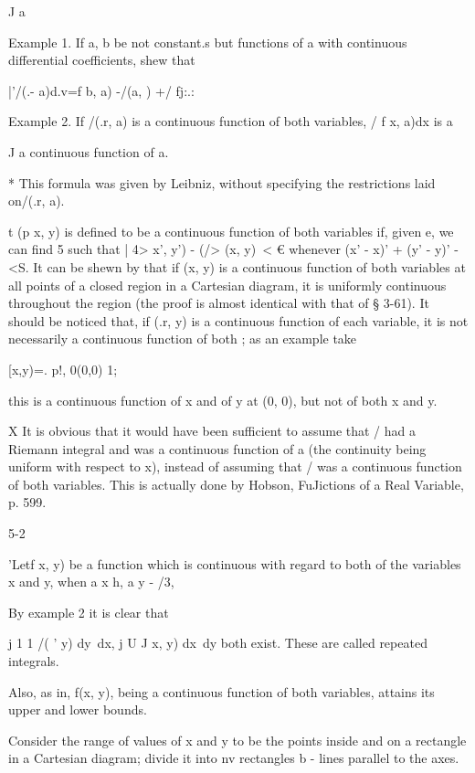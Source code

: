 J a

Example 1. If a, b be not constant.s but functions of a with
continuous differential coefficients, shew that

 |'/(.- a)d.v=f b, a) -/(a, ) +/ fj:.:

Example 2. If /(.r, a) is a continuous function of both variables, / f
x, a)dx is a

J a continuous function of a.

* This formula was given by Leibniz, without specifying the
restrictions laid on/(.r, a).

t (p x, y) is defined to be a continuous function of both variables
if, given e, we can find 5 such that | 4> x', y') - (/> (x, y)\ < €
whenever (x' - x)' + (y' - y)' -<S. It can be shewn by that if
(x, y) is a continuous function of both variables at all points of a
closed region in a Cartesian diagram, it is uniformly continuous
throughout the region (the proof is almost identical with that of §
3-61). It should be noticed that, if (.r, y) is a continuous function
of each variable, it is not necessarily a continuous function of both
; as an example take

 [x,y)=. p!, 0(0,0) 1;

this is a continuous function of x and of y at (0, 0), but not of both
x and y.

X It is obvious that it would have been sufficient to assume that /
had a Riemann integral and was a continuous function of a (the
continuity being uniform with respect to x), instead of assuming that
/ was a continuous function of both variables. This is actually done
by Hobson, FuJictions of a Real Variable, p. 599.

5-2

%
%


'Letf x, y) be a function which is continuous with regard to both of
the variables x and y, when a x h, a y - /3,

By example 2 it is clear that

j 1 1 /( ' y) dy\ dx, j U J x, y) dx\ dy both exist. These are called
repeated integrals.

Also, as in, f(x, y), being a continuous function of both
variables, attains its upper and lower bounds.

Consider the range of values of x and y to be the points inside and on
a rectangle in a Cartesian diagram; divide it into nv rectangles b -
lines parallel to the axes.

